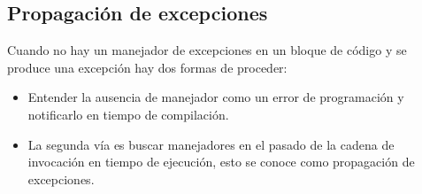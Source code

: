 \subsection{Propagación de excepciones}

Cuando no hay un manejador de excepciones en un bloque de código y se produce
una excepción hay dos formas de proceder:

\begin{itemize}
	\item Entender la ausencia de manejador como un error de programación y
		notificarlo en tiempo de compilación.
	\item La segunda vía es buscar manejadores en el pasado de la cadena de
		invocación en tiempo de ejecución, esto se conoce como
		propagación de excepciones.
\end{itemize}
